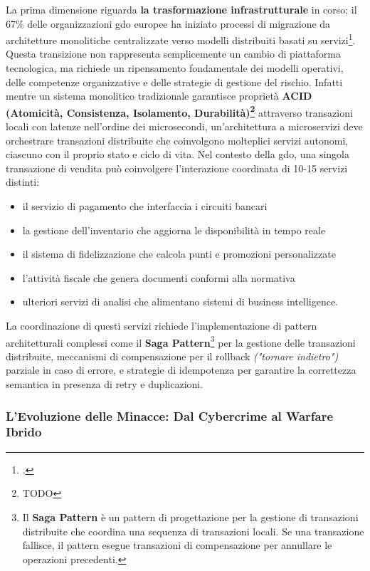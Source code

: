 La prima dimensione riguarda \textbf{la trasformazione infrastrutturale} in corso; il 67\% delle organizzazioni \gls{gdo} europee ha iniziato processi di migrazione da architetture monolitiche centralizzate verso modelli distribuiti basati su servizi\footcite{gartner2024cloud}. Questa transizione non rappresenta semplicemente un cambio di piattaforma tecnologica, ma richiede un ripensamento fondamentale dei modelli operativi, delle competenze organizzative e delle strategie di gestione del rischio. Infatti mentre un sistema monolitico tradizionale garantisce proprietà \textbf{ACID (Atomicità, Consistenza, Isolamento, Durabilità)\footnote{TODO}} attraverso transazioni locali con latenze nell'ordine dei microsecondi, un'architettura a microservizi deve orchestrare transazioni distribuite che coinvolgono molteplici servizi autonomi, ciascuno con il proprio stato e ciclo di vita. 
Nel contesto della \gls{gdo}, una singola transazione di vendita può coinvolgere l'interazione coordinata di 10-15 servizi distinti: 
\begin{itemize}
    \item il servizio di pagamento che interfaccia i circuiti bancari
    \item la gestione dell'inventario che aggiorna le disponibilità in tempo reale
    \item il sistema di fidelizzazione che calcola punti e promozioni personalizzate
    \item l'attività fiscale che genera documenti conformi alla normativa
    \item ulteriori servizi di analisi che alimentano sistemi di business intelligence.
\end{itemize}
La coordinazione di questi servizi richiede l'implementazione di pattern architetturali complessi come il \textbf{Saga Pattern}\footnote{Il \textbf{Saga Pattern} è un pattern di progettazione per la gestione di transazioni distribuite che coordina una sequenza di transazioni locali. Se una transazione fallisce, il pattern esegue transazioni di compensazione per annullare le operazioni precedenti.} per la gestione delle transazioni distribuite, meccanismi di compensazione per il rollback \emph{("tornare indietro")} parziale in caso di errore, e strategie di idempotenza per garantire la correttezza semantica in presenza di retry e duplicazioni.

\subsubsection{L'Evoluzione delle Minacce: Dal Cybercrime al Warfare Ibrido}

